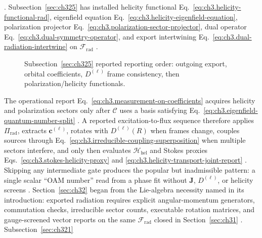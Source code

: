 \cite{stratton1941}.
Subsection~\ref{sec:ch325} has installed helicity functional
Eq.~\eqref{eq:ch3.helicity-functional-rad}, eigenfield equation
Eq.~\eqref{eq:ch3.helicity-eigenfield-equation}, polarization projector
Eq.~\eqref{eq:ch3.polarization-sector-projector}, dual operator
Eq.~\eqref{eq:ch3.dual-symmetry-operator}, and export intertwining
Eq.~\eqref{eq:ch3.dual-radiation-intertwine} on \(\mathcal{F}_{\mathrm{rad}}\)
\cite{belinfante1940}.
\begin{figure}[t]
\centering
{}
\caption{Subsection~\ref{sec:ch325} reported reporting order: outgoing export, orbital coefficients,
\(D^{(\ell)}\) frame consistency, then polarization/helicity functionals.}
\label{fig:ch3.helicity-measurement-order}
\end{figure}
The operational report Eq.~\eqref{eq:ch3.measurement-on-coefficients} acquires helicity and polarization
sectors only after \(\mathcal{C}\) uses a basis satisfying
Eq.~\eqref{eq:ch3.eigenfield-quantum-number-split} \cite{harrington2001}. A reported excitation-to-flux sequence
therefore applies \(\Pi_{\mathrm{rad}}\), extracts \(\mathbf{c}^{(\ell)}\), rotates with
\(D^{(\ell)}(R)\) when frames change, couples sources through
Eq.~\eqref{eq:ch3.irreducible-coupling-superposition} when multiple sectors interfere, and only then evaluates
\(\mathcal{H}_{\mathrm{hel}}\) and Stokes proxies Eqs.~\eqref{eq:ch3.stokes-helicity-proxy} and
\eqref{eq:ch3.helicity-transport-joint-report} \cite{stratton1941}. Skipping any
intermediate gate produces the popular but inadmissible pattern: a single scalar ``OAM number'' read from a
phase fit without \(\mathbf{J}\), \(D^{(\ell)}\), or helicity screens \cite{allen1992}.
Section~\ref{sec:ch32} began from the Lie-algebra necessity named in its introduction: exported radiation
requires explicit angular-momentum generators, commutation checks, irreducible sector counts, executable
rotation matrices, and gauge-screened vector reports on the same \(\mathcal{F}_{\mathrm{rad}}\) closed in
Section~\ref{sec:ch31} \cite{jackson1999}. Subsection~\ref{sec:ch321}
